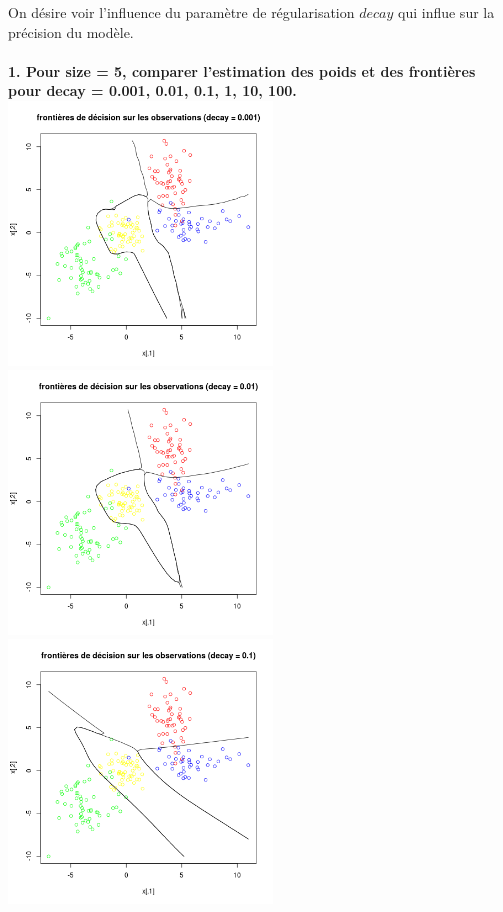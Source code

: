 \documentclass[a4paper, 10pt]{article}
\begin{document}
On désire voir l'influence du paramètre de régularisation $decay$ qui influe sur la précision du modèle.\\ \\
\textbf{1. Pour size = 5, comparer l'estimation des poids et des frontières pour decay = 0.001, 0.01, 0.1, 1, 10, 100.}\\
\includegraphics[height = 7cm, width = 7cm]{plots/frontiere_bayes_q4_1.png}
\includegraphics[height = 7cm, width = 7cm]{plots/frontiere_bayes_q4_2.png}\\
\includegraphics[height = 7cm, width = 7cm]{plots/frontiere_bayes_q4_3.png}
\end{document}
